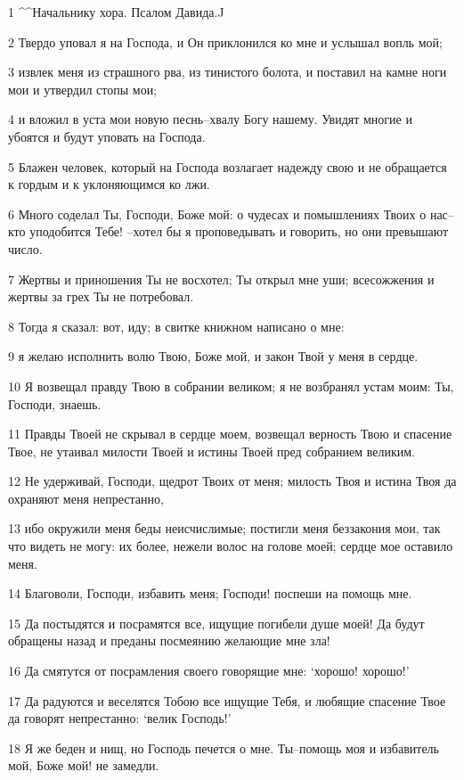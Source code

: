 \par 1 ^^Начальнику хора. Псалом Давида.^^
\par 2 Твердо уповал я на Господа, и Он приклонился ко мне и услышал вопль мой;
\par 3 извлек меня из страшного рва, из тинистого болота, и поставил на камне ноги мои и утвердил стопы мои;
\par 4 и вложил в уста мои новую песнь--хвалу Богу нашему. Увидят многие и убоятся и будут уповать на Господа.
\par 5 Блажен человек, который на Господа возлагает надежду свою и не обращается к гордым и к уклоняющимся ко лжи.
\par 6 Много соделал Ты, Господи, Боже мой: о чудесах и помышлениях Твоих о нас--кто уподобится Тебе! --хотел бы я проповедывать и говорить, но они превышают число.
\par 7 Жертвы и приношения Ты не восхотел; Ты открыл мне уши; всесожжения и жертвы за грех Ты не потребовал.
\par 8 Тогда я сказал: вот, иду; в свитке книжном написано о мне:
\par 9 я желаю исполнить волю Твою, Боже мой, и закон Твой у меня в сердце.
\par 10 Я возвещал правду Твою в собрании великом; я не возбранял устам моим: Ты, Господи, знаешь.
\par 11 Правды Твоей не скрывал в сердце моем, возвещал верность Твою и спасение Твое, не утаивал милости Твоей и истины Твоей пред собранием великим.
\par 12 Не удерживай, Господи, щедрот Твоих от меня; милость Твоя и истина Твоя да охраняют меня непрестанно,
\par 13 ибо окружили меня беды неисчислимые; постигли меня беззакония мои, так что видеть не могу: их более, нежели волос на голове моей; сердце мое оставило меня.
\par 14 Благоволи, Господи, избавить меня; Господи! поспеши на помощь мне.
\par 15 Да постыдятся и посрамятся все, ищущие погибели душе моей! Да будут обращены назад и преданы посмеянию желающие мне зла!
\par 16 Да смятутся от посрамления своего говорящие мне: `хорошо! хорошо!'
\par 17 Да радуются и веселятся Тобою все ищущие Тебя, и любящие спасение Твое да говорят непрестанно: `велик Господь!'
\par 18 Я же беден и нищ, но Господь печется о мне. Ты--помощь моя и избавитель мой, Боже мой! не замедли.

